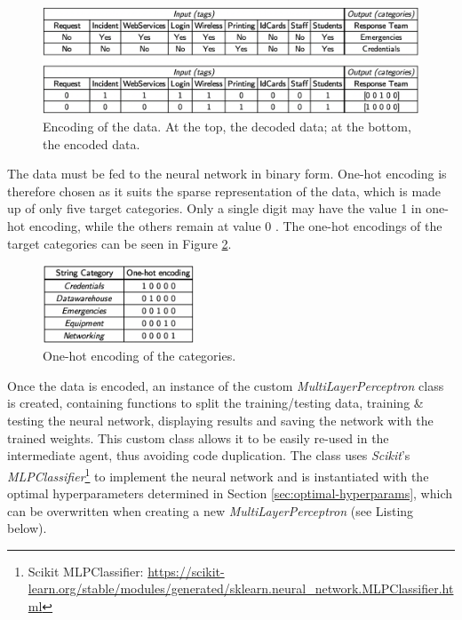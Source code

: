 \documentclass[letterpaper,12pt]{article}
\begin{document}
\begin{figure}[h] 
\centerline{\includegraphics[width=\textwidth]{report/figures/data_encoding.png}}
\caption{\label{fig:data_encoding}Encoding of the data. At the top, the decoded data; at the bottom, the encoded data.}
\end{figure}

The data must be fed to the neural network in binary form. One-hot encoding is therefore chosen as it suits the sparse representation of the data, which is made up of only five target categories. Only a single digit may have the value 1 in one-hot encoding, while the others remain at value 0 \cite{lec16}. The one-hot encodings of the target categories can be seen in Figure \ref{fig:one_hot_encoding}.

\begin{figure}[h] 
\centerline{\includegraphics[width=0.4\textwidth]{report/figures/one_hot_encoding.png}}
\caption{\label{fig:one_hot_encoding}One-hot encoding of the categories.}
\end{figure}

Once the data is encoded, an instance of the custom \textit{MultiLayerPerceptron} class is created, containing functions to split the training/testing data, training \& testing the neural network, displaying results and saving the network with the trained weights. This custom class allows it to be easily re-used in the intermediate agent, thus avoiding code duplication. The class uses \textit{Scikit}'s \textit{MLPClassifier}\footnote{Scikit MLPClassifier: \url{https://scikit-learn.org/stable/modules/generated/sklearn.neural_network.MLPClassifier.html}} to implement the neural network and is instantiated with the optimal hyperparameters determined in Section \ref{sec:optimal-hyperparams}, which can be overwritten when creating a new \textit{MultiLayerPerceptron} (see Listing below).
\end{document}
